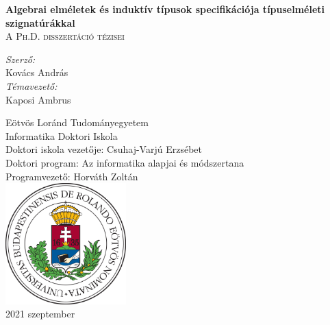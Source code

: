 \documentclass[12pt]{article}
\begin{document}
\clearpage

\begin{titlepage}
    \begin{center}
        \vspace*{1cm}

        {\LARGE \textbf{Algebrai elméletek és induktív típusok specifikációja típuselméleti szignatúrákkal}}\\
        \vspace{1em}
        {\large \textsc{A Ph.D. disszertáció tézisei}}

        \vspace{2em}

        \textit{Szerző:}\\
        {\large Kovács András}\\
        \vspace{1em}
        \textit{Témavezető:}\\
        {\large Kaposi Ambrus}

        \vfill
        \vspace{4em}

        {\normalsize
        Eötvös Loránd Tudományegyetem\\
        Informatika Doktori Iskola\\
        Doktori iskola vezetője: Csuhaj-Varjú Erzsébet\\
        Doktori program: Az informatika alapjai és módszertana\\
        Programvezető: Horváth Zoltán\\}
        \vspace{1em}
        \includegraphics[width=0.35\textwidth]{elte_cimer_szines}\\
        \vspace{1em}
        {\large 2021 szeptember}

    \end{center}
\end{titlepage}
\thispagestyle{empty}
\end{document}
